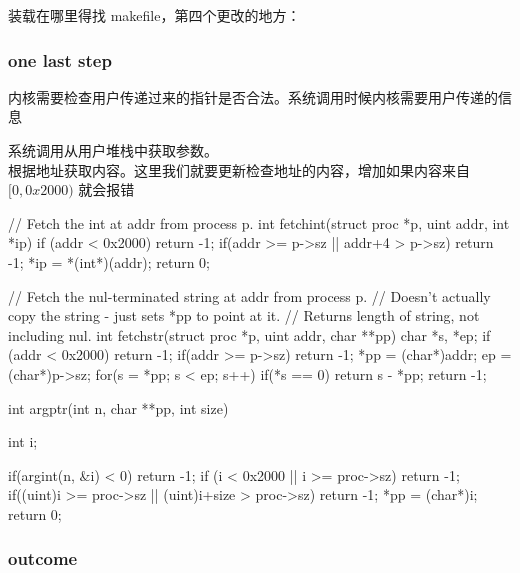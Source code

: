  装载在哪里得找 makefile，第四个更改的地方：


\subsubsection{one last step}

内核需要检查用户传递过来的指针是否合法。系统调用时候内核需要用户传递的信息

系统调用从用户堆栈中获取参数。 \\
 根据地址获取内容。这里我们就要更新检查地址的内容，增加如果内容来自 $[0,0x2000)$ 就会报错

\begin{ccode}
    // Fetch the int at addr from process p.
    int
    fetchint(struct proc *p, uint addr, int *ip)
    {
        if (addr < 0x2000) return -1;
        if(addr >= p->sz || addr+4 > p->sz)
            return -1;
        *ip = *(int*)(addr);
        return 0;
    }

    // Fetch the nul-terminated string at addr from process p.
    // Doesn't actually copy the string - just sets *pp to point at it.
    // Returns length of string, not including nul.
    int
    fetchstr(struct proc *p, uint addr, char **pp)
    {
        char *s, *ep;
        if (addr < 0x2000) return -1;
        if(addr >= p->sz)
            return -1;
        *pp = (char*)addr;
        ep = (char*)p->sz;
        for(s = *pp; s < ep; s++)
            if(*s == 0)
            return s - *pp;
        return -1;
    }

    int
    argptr(int n, char **pp, int size)
    {
        int i;
        
        if(argint(n, &i) < 0)
            return -1;
        if (i < 0x2000 || i >= proc->sz) return -1;
        if((uint)i >= proc->sz || (uint)i+size > proc->sz)
            return -1;
        *pp = (char*)i;
        return 0;
    }
\end{ccode}

\subsubsection{outcome}

